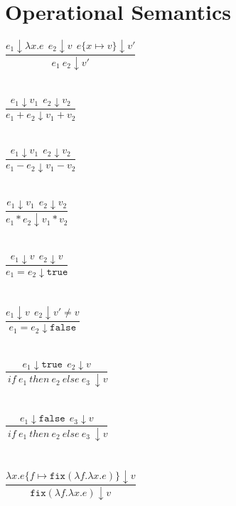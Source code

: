 \documentclass{westhesis}
\theoremstyle{plain}
\theoremstyle{definition}
\begin{document}
\section{Operational Semantics} 
$\dfrac{e_1 \downarrow \lambda x.e \ \ e_2 \downarrow v \ \ e\{x \mapsto v\} \downarrow v'}{e_1 \ e_2 \downarrow v'}$ \\ \\ \\
$\dfrac{e_1 \downarrow v_1 \ \ e_2 \downarrow v_2}{e_1 + e_2 \downarrow v_1 + v_2}$ \\ \\ \\
$\dfrac{e_1 \downarrow v_1 \ \ e_2 \downarrow v_2}{e_1 - e_2 \downarrow v_1 - v_2}$ \\ \\ \\
$\dfrac{e_1 \downarrow v_1 \ \ e_2 \downarrow v_2}{e_1 * e_2 \downarrow v_1 * v_2}$ \\ \\ \\
$\dfrac{e_1 \downarrow v \ \ e_2 \downarrow v}{e_1 = e_2 \downarrow \texttt{true}}$ \\ \\ \\
$\dfrac{e_1 \downarrow v \ \ e_2 \downarrow v' \neq v}{e_1 = e_2 \downarrow \texttt{false}}$ \\ \\ \\
$\dfrac{e_1 \downarrow \texttt{true} \ \ e_2 \downarrow v}{\ if \ e_1 \ then \ e_2 \ else \ e_3 \ \downarrow v}$ \\ \\ \\
$\dfrac{e_1 \downarrow \texttt{false} \ \ e_3 \downarrow v}{\ if \ e_1 \ then \ e_2 \ else \ e_3 \ \downarrow v}$ \\ \\ \\
$\dfrac{\lambda x.e\{ f \mapsto \texttt{fix}(\lambda f.\lambda x.e)\} \downarrow v}{\texttt{fix} (\lambda f.\lambda x.e) \downarrow 
v}$
\end{document}
